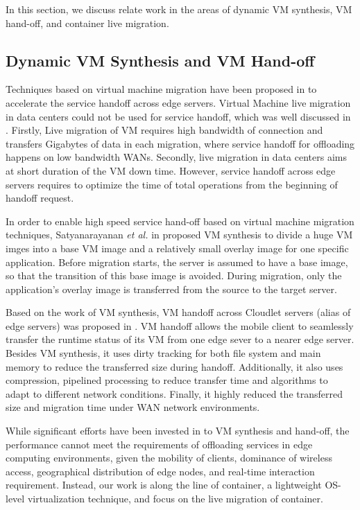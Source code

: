 In this section, we discuss relate work in the areas of dynamic VM synthesis, VM hand-off, and container live migration.

\subsection{Dynamic VM Synthesis and VM Hand-off} \label{motivation:vmhandoff}

Techniques based on virtual machine migration have been proposed in  \cite{ha2015vmhandoff} \cite{satya2009case} to accelerate the service handoff across edge servers. Virtual Machine live migration in data centers could not be used for service handoff, which was well discussed in \cite{ha2015vmhandoff}. Firstly, Live migration of VM requires high bandwidth of connection and transfers Gigabytes of data in each migration, where service handoff for offloading happens on low bandwidth WANs. Secondly, live migration in data centers aims at short duration of the VM down time. However, service handoff across edge servers requires to optimize the time of total operations from the beginning of handoff request. 

In order to enable high speed service hand-off based on virtual machine migration techniques, Satyanarayanan \textit{et al.} in \cite{satya2009case} proposed VM synthesis to divide a huge VM imges into a base VM image and a relatively small overlay image for one specific application. Before migration starts, the server is assumed to have a base image, so that the transition of this base image is avoided. During migration, only the application's overlay image is transferred from the source to the target server.

Based on the work of VM synthesis, VM handoff across Cloudlet servers (alias of edge servers) was proposed in \cite{ha2015vmhandoff}. VM handoff allows the mobile client to seamlessly transfer the runtime status of its VM from one edge sever to a nearer edge server. Besides VM synthesis, it uses dirty tracking for both file system and main memory  to reduce the transferred size during handoff.
Additionally, it also uses compression, pipelined processing to reduce transfer time and algorithms to adapt to different network conditions.
Finally, it highly reduced the transferred size and migration time under WAN network environments.

While significant efforts have been invested in to VM synthesis and hand-off, the performance cannot meet the requirements of offloading services in edge computing environments, given the mobility of clients, dominance of wireless access, geographical distribution of edge nodes, and real-time interaction requirement. Instead,  our work is along the line of container, a lightweight OS-level virtualization technique, and focus on the live migration of container. 

